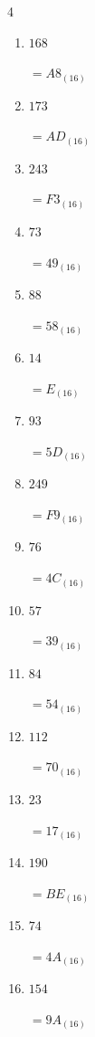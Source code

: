 \begin{multicols}{4}
\begin{enumerate}
        $=5_{(16)}$

  \item $168$

        $=A8_{(16)}$

  \item $173$

        $=AD_{(16)}$

  \item $243$

        $=F3_{(16)}$

  \item $73$

        $=49_{(16)}$

  \item $88$

        $=58_{(16)}$

\columnbreak %

  \item $14$

        $=E_{(16)}$

  \item $93$

        $=5D_{(16)}$

  \item $249$

        $=F9_{(16)}$

  \item $76$

        $=4C_{(16)}$

  \item $57$

        $=39_{(16)}$

  \item $84$

        $=54_{(16)}$

  \item $112$

        $=70_{(16)}$

  \item $23$

        $=17_{(16)}$

  \item $190$

        $=BE_{(16)}$

  \item $74$

        $=4A_{(16)}$

  \item $154$

        $=9A_{(16)}$


\end{enumerate}
\end{multicols}
